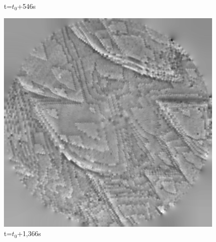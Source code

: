 \begin{figure}[!ht]
    \caption*{t=$t_0$+546s}
\endminipage\hfill
{}%
  	\includegraphics[width=\linewidth]{images/006_X10s50l10m_MOv2_290.png}
    \caption*{t=$t_0$+1,366s} 

\endminipage

\end{figure}


